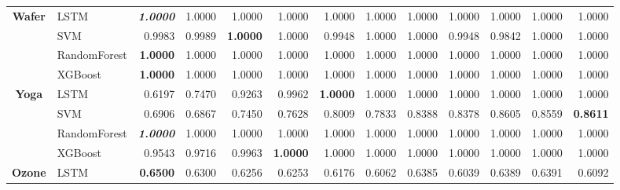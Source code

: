 \begin{table}[H]
\begin{adjustbox}{max width=14cm}
\begin{tabular}{|c|l|r|r|r|r|r|r|r|r|r|r|r|}
			\hline
			\textbf{Wafer}        & LSTM         & \textit{\textbf{1.0000}} & 1.0000          & 1.0000          & 1.0000          & 1.0000                   & 1.0000          & 1.0000 & 1.0000 & 1.0000          & 1.0000                   & 1.0000                   \\
			                      & SVM          & 0.9983                   & 0.9989          & \textbf{1.0000} & 1.0000          & 0.9948                   & 1.0000          & 1.0000 & 0.9948 & 0.9842          & 1.0000                   & 1.0000                   \\
			                      & RandomForest & \textbf{1.0000}          & 1.0000          & 1.0000          & 1.0000          & 1.0000                   & 1.0000          & 1.0000 & 1.0000 & 1.0000          & 1.0000                   & 1.0000                   \\
			                      & XGBoost      & \textbf{1.0000}          & 1.0000          & 1.0000          & 1.0000          & 1.0000                   & 1.0000          & 1.0000 & 1.0000 & 1.0000          & 1.0000                   & 1.0000                   \\
			\hline
			\textbf{Yoga}         & LSTM         & 0.6197                   & 0.7470          & 0.9263          & 0.9962          & \textbf{1.0000}          & 1.0000          & 1.0000 & 1.0000 & 1.0000          & 1.0000                   & 1.0000                   \\
			                      & SVM          & 0.6906                   & 0.6867          & 0.7450          & 0.7628          & 0.8009                   & 0.7833          & 0.8388 & 0.8378 & 0.8605          & 0.8559                   & \textbf{0.8611}          \\
			                      & RandomForest & \textit{\textbf{1.0000}} & 1.0000          & 1.0000          & 1.0000          & 1.0000                   & 1.0000          & 1.0000 & 1.0000 & 1.0000          & 1.0000                   & 1.0000                   \\
			                      & XGBoost      & 0.9543                   & 0.9716          & 0.9963          & \textbf{1.0000} & 1.0000                   & 1.0000          & 1.0000 & 1.0000 & 1.0000          & 1.0000                   & 1.0000                   \\
			\hline
			\textbf{Ozone}        & LSTM         & \textbf{0.6500}          & 0.6300          & 0.6256          & 0.6253          & 0.6176                   & 0.6062          & 0.6385 & 0.6039 & 0.6389          & 0.6391                   & 0.6092                   \\

\end{tabular}
\end{adjustbox}
\end{table}

